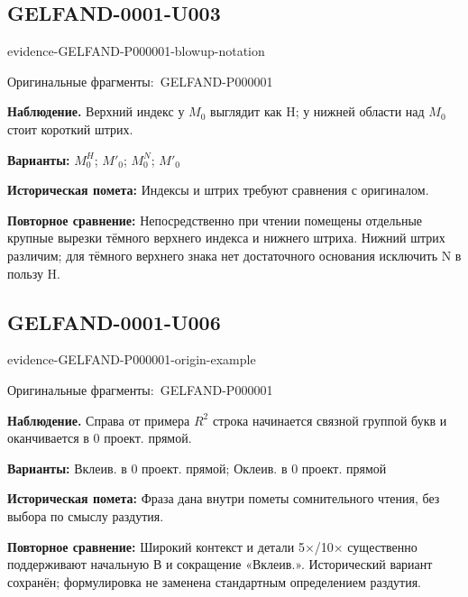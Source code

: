 \documentclass[11pt]{article}
\newcommand{\EvidenceBlock}[4]{%
 \par\smallskip\noindent\begin{minipage}{\linewidth}
 \begin{minipage}[t]{.47\linewidth}\vspace{0pt}\centering
 \csname evidence-#1-#2\endcsname\par
 {\scriptsize\SourceCropCaption\ #1}\par
 \end{minipage}\hfill
 \begin{minipage}[t]{.49\linewidth}\vspace{0pt}\raggedright
 {\small\color{orange!65!black}\textbf{#4} #3}\par
 \end{minipage}
 \end{minipage}\par\smallskip}
\newcommand{\SourceCropCaption}{Оригинальные фрагменты:}\newcommand{\ReadingCaption}{Сомнительное чтение.}\newcommand{\IncompleteCaption}{Неразобранный фрагмент.}\newcommand{\DiagramCaption}{Рисунок и набранное описание.}
\begin{document}
\subsection*{GELFAND-0001-U003}
\EvidenceBlock{GELFAND-P000001}{blowup-notation}{Верхний индекс у \(M_0\) выглядит как H; у нижней области над \(M_0\) стоит короткий штрих.}{Наблюдение.}
\textbf{Варианты: } \(M_0^H\); \(M'_0\); \(M_0^N\); \(M'_0\)\par
\textbf{Историческая помета: } Индексы и штрих требуют сравнения с оригиналом.\par
\textbf{Повторное сравнение: } Непосредственно при чтении помещены отдельные крупные вырезки тёмного верхнего индекса и нижнего штриха. Нижний штрих различим; для тёмного верхнего знака нет достаточного основания исключить N в пользу H.\par
\subsection*{GELFAND-0001-U006}
\EvidenceBlock{GELFAND-P000001}{origin-example}{Справа от примера \(R^2\) строка начинается связной группой букв и оканчивается в 0 проект. прямой.}{Наблюдение.}
\textbf{Варианты: } Вклеив. в 0 проект. прямой; Оклеив. в 0 проект. прямой\par
\textbf{Историческая помета: } Фраза дана внутри пометы сомнительного чтения, без выбора по смыслу раздутия.\par
\textbf{Повторное сравнение: } Широкий контекст и детали 5×/10× существенно поддерживают начальную В и сокращение «Вклеив.». Исторический вариант сохранён; формулировка не заменена стандартным определением раздутия.\par
\end{document}
